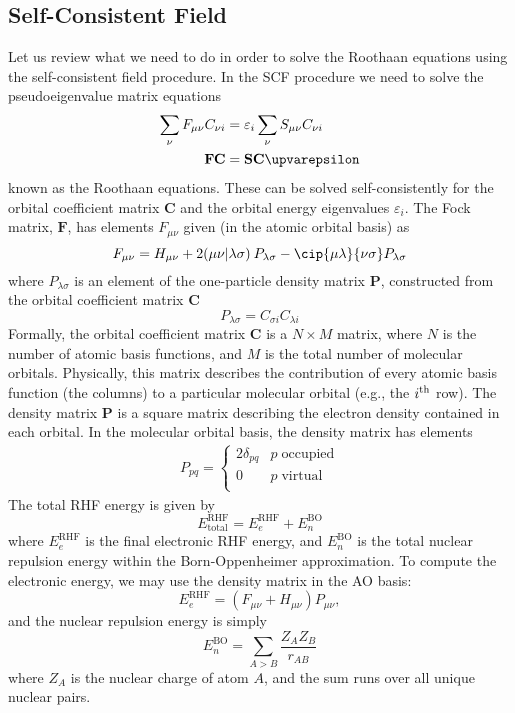 \documentclass[11pt]{article}
\begin{document}
\subsection{Self-Consistent Field}
Let us review what we need to do in order to solve the Roothaan equations using the self-consistent field procedure. In the SCF procedure we need to solve the pseudoeigenvalue matrix equations
\begin{align*}
\sum_{\nu} F_{\mu\nu}C_{\nu i} &= \varepsilon_i\sum_{\nu}S_{\mu\nu}C_{\nu i}\\
{\bf FC} &= {\mathbf{SC} \bm{\upvarepsilon}}
\end{align*}
known as the Roothaan equations. These can be solved self-consistently for the orbital coefficient matrix $\mathbf{C}$ and the orbital energy eigenvalues $\varepsilon_i$. The Fock matrix, $\mathbf{F}$, has elements $F_{\mu\nu}$ given (in the atomic orbital basis) as
\[F_{\mu\nu} = H_{\mu\nu} + 2(\mu\nu|\lambda\sigma)\:P_{\lambda\sigma} - \cip{\mu\lambda}{\nu\sigma}P_{\lambda\sigma}\]
where $P_{\lambda\sigma}$ is an element of the one-particle density matrix $\mathbf{P}$, constructed from the orbital coefficient matrix $\mathbf{C}$
\[P_{\lambda\sigma} = C_{\sigma i}C_{\lambda i}\]
Formally, the orbital coefficient matrix $\mathbf{C}$ is a $N\times M$ matrix, where $N$ is the number of atomic basis functions, and $M$ is the total number of molecular orbitals.  Physically, this matrix describes the contribution of every atomic basis function (the columns) to a particular molecular orbital (e.g., the $i^{\rm th}$ row).  The density matrix $\mathbf{P}$ is a square matrix describing the electron density contained in each orbital. In the molecular orbital basis, the density matrix has elements
\begin{align*}
P_{pq} = \left\{
\begin{array}{ll}
2\delta_{pq} & p\; {\text{occupied}} \\
0 & p\; \text{virtual} \\
\end{array}\right.
\end{align*}
The total RHF energy is given by
\[E^{\text{RHF}}_{\text{total}} = E^{\text{RHF}}_{e} + E^{\text{BO}}_{n}\]
where $E^{\text{RHF}}_{e}$ is the final electronic RHF energy, and $E^{\text{BO}}_{n}$ is the total nuclear repulsion energy within the Born-Oppenheimer approximation.  To compute the electronic energy, we may use the density matrix in the AO basis:
\[E^{\text{RHF}}_{e} = (F_{\mu\nu} + H_{\mu\nu})P_{\mu\nu},\]
and the nuclear repulsion energy is simply
\[E^{\text{BO}}_{n} = \sum_{A>B}\frac{Z_A Z_B}{r_{AB}}\]
where $Z_A$ is the nuclear charge of atom $A$, and the sum runs over all unique nuclear pairs.
\end{document}
